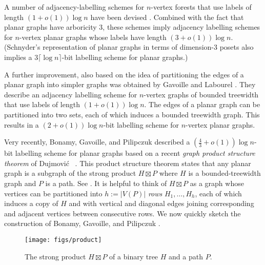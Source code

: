 \documentclass[kpfonts]{patmorin}
\begin{document}
A number of adjacency-labelling schemes for $n$-vertex forests that use labels of length $(1+o(1))\log n$ have been devised \cite{chu, ar02, adbk17}.  Combined with the fact that planar graphs have arboricity 3, these schemes imply adjacency labelling schemes for $n$-vertex planar graphs whose labels have length $(3+o(1))\log n$.   (Schnyder's representation of planar graphs in terms of dimension-3 posets \cite{schnyder:planar} also implies a $3\lceil\log n\rceil$-bit labelling scheme for planar graphs.)

A further improvement, also based on the idea of partitioning the edges of a planar graph into simpler graphs was obtained by Gavoille and Labourel \cite{gavoille.labourel:smaller}.  They describe an adjacency labelling scheme for $n$-vertex graphs of bounded treewidth that use labels of length $(1+o(1))\log n$.  The edges of a planar graph can be partitioned into two sets, each of which induces a bounded treewidth graph.  This results in a $(2+o(1))\log n$-bit labelling scheme for $n$-vertex planar graphs.

Very recently, Bonamy, Gavoille, and Pilipczuk \cite{bonamy.gavoille.ea:shorter} described a $(\tfrac43+o(1))\log n$-bit labelling scheme for planar graphs based on a recent \emph{graph product structure theorem} of Dujmović \etal\ \cite{dujmovic.joret.ea:planar}.  This product structure theorem states that any planar graph is a subgraph of the strong product $H\boxtimes P$ where $H$ is a bounded-treewidth graph and $P$ is a path. See . It is helpful to think of $H\boxtimes P$ as a graph whose vertices can be partitioned into $h:=|V(P)|$ \emph{rows} $H_1,\ldots,H_{h}$, each of which induces a copy of $H$ and with vertical and diagonal edges joining corresponding and adjacent vertices between consecutive rows.  We now quickly sketch the construction of Bonamy, Gavoille, and Pilipczuk \cite{bonamy.gavoille.ea:shorter}.

\begin{figure}
  \begin{center}
    \texttt{[image: figs/product]}
  \end{center}
  \caption{The strong product $H\boxtimes P$ of a binary tree $H$ and a path $P$.}
\end{figure}  
\end{document}
